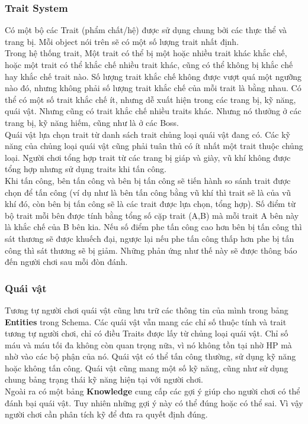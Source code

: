 \subsubsection{Trait System}
\hspace*{0.5cm} Có một bộ các Trait (phẩm chất/hệ) được sử dụng chung bởi các thực thể và trang bị. Mỗi object nói trên sẽ có một số lượng trait nhất định.\\
\hspace*{0.5cm} Trong hệ thống trait, Một trait có thể bị một hoặc nhiều trait khác khắc chế, hoặc một trait có thể khắc chế nhiều trait khác, cũng có thể không bị khắc chế hay khắc chế trait nào. Số lượng trait khắc chế không được vượt quá một ngưỡng nào đó, nhưng không phải số lượng trait khắc chế của mỗi trait là bằng nhau. Có thể có một số trait khắc chế ít, nhưng dễ xuất hiện trong các trang bị, kỹ năng, quái vật. Nhưng cũng có trait khắc chế nhiều traits khác. Nhưng nó thưởng ở các trang bị, kỹ năng hiếm, cũng như là ở các Boss.\\ 
\hspace*{0.5cm} Quái vật lựa chọn trait từ danh sách trait chủng loại quái vật đang có. Các kỹ năng của chủng loại quái vật cũng phải tuân thủ có ít nhất một trait thuộc chủng loại. Người chơi tổng hợp trait từ các trang bị giáp và giày, vũ khí không được tổng hợp nhưng sử dụng traits khi tấn công.\\
\hspace*{0.5cm} Khi tấn công, bên tấn công và bên bị tấn công sẽ tiến hành so sánh trait được chọn để tấn công (ví dụ như là bên tấn công bằng vũ khí thì trait sẽ là của vũ khí đó, còn bên bị tấn công sẽ là các trait được lựa chọn, tổng hợp). Số điểm từ bộ trait mỗi bên được tính bằng tổng số cặp trait (A,B) mà mỗi trait A bên này là khắc chế của B bên kia. Nếu số điểm phe tấn công cao hơn bên bị tấn công thì sát thương sẽ được khuếch đại, ngược lại nếu phe tấn công thấp hơn phe bị tấn công thì sát thương sẽ bị giảm. Những phản ứng như thế này sẽ được thông báo đến người chơi sau mỗi đòn đánh.\\

\subsubsection{Quái vật}
\hspace*{0.5cm} Tương tự người chơi quái vật cũng lưu trữ các thông tin của mình trong bảng \textbf{Entities} trong Schema. Các quái vật vẫn mang các chỉ số thuộc tính và trait tương tự người chơi, chỉ có điều Traits được lấy từ chủng loại quái vật. Chỉ số máu và máu tối đa không còn quan trọng nữa, vì nó không tồn tại nhờ HP mà nhờ vào các bộ phận của nó. Quái vật có thể tấn công thường, sử dụng kỹ năng hoặc không tấn công. Quái vật cũng mang một số kỹ năng, cũng như sử dụng chung bảng trạng thái kỹ năng hiện tại với người chơi.\\
\hspace*{0.5cm} Ngoài ra có một bảng \textbf{Knowledge} cung cấp các gợi ý giúp cho người chơi có thể đánh bại quái vật. Tuy nhiên những gợi ý này có thể đúng hoặc có thể sai. Vì vậy người chơi cần phân tích kỹ để đưa ra quyết định đúng.\\
